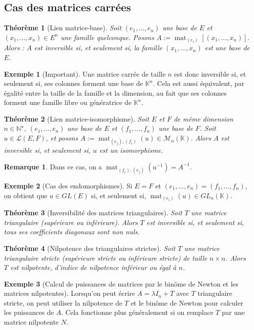 \documentclass[french]{book}
\newcommand{\N}{\mathbb{N}}
\newcommand{\K}{\mathbb{K}}
\newcommand{\st}{^\star}
\newcommand{\inv}{^{-1}}
\theoremstyle{plain}
\newtheorem{thm}{Théorème}[chapter]
\theoremstyle{definition}
\newtheorem{exa}{Exemple}[chapter]
\newtheorem{rmq}{Remarque}[chapter]
\theoremstyle{remark}
\DeclareMathOperator{\mat}{mat}
\begin{document}
\subsection{Cas des matrices carrées}
\begin{thm}[Lien matrice-base]
	Soit $(e_1,\ldots,e_n)$ une base de $E$ et $(x_1,\ldots,x_n)\in E^n$ une famille quelconque. Posons $A:=\mat_{(e_i)}\left[(x_1,\ldots,x_n)\right]$. Alors : $A$ est inversible si, et seulement si, la famille $(x_1,\ldots,x_n)$ est une base de $E$.
\end{thm}
\begin{exa}[Important]
	Une matrice carrée de taille $n$ est donc inversible si, et seulement si, ses colonnes forment une base de $\K^n$. Cela est aussi équivalent, par égalité entre la taille de la famille et la dimension, au fait que ses colonnes forment une famille libre ou génératrice de $\K^n$.
\end{exa}
\begin{thm}[Lien matrice-isomorphisme]
	Soit $E$ et $F$ de même dimension $n\in\N\st$, $(e_1,\ldots,e_n)$ une base de $E$ et $(f_1,\ldots,f_n)$ une base de $F$. Soit $u\in\mathcal{L}(E,F)$, et posons $A:=\mat_{(e_j),(f_i)}(u)\in\mathcal{M}_n(\K)$. Alors $A$ est inversible si, et seulement si, $u$ est un isomorphisme.
\end{thm}
\begin{rmq}
	Dans ce cas, on a $\mat_{(f_i),(e_j)}(u\inv)=A\inv$.
\end{rmq}
\begin{exa}[Cas des endomorphismes]
	Si $E=F$ et $(e_1,\ldots,e_n)=(f_1,\ldots,f_n)$, on obtient que $u\in GL(E)$ si, et seulement si, $\mat_{(e_i)}(u)\in GL_n(\K)$.
\end{exa}
\begin{thm}[Inversibilité des matrices triangulaires]
	Soit $T$ une matrice triangulaire (supérieure ou inférieure). Alors $T$ est inversible si, et seulement si, tous ses coefficients diagonaux sont non nuls.
\end{thm}
\begin{thm}[Nilpotence des triangulaires strictes]
	Soit $T$ une matrice triangulaire stricte (supérieure stricte ou inférieure stricte) de taille $n\times n$. Alors $T$ est nilpotente, d'indice de nilpotence inférieur ou égal à $n$.
\end{thm}
\begin{exa}[Calcul de puissances de matrices par le binôme de Newton et les matrices nilpotentes]
	Lorsqu'on peut écrire $A=\lambda I_n+T$ avec $T$ triangulaire stricte, on peut utiliser la nilpotence de $T$ et le binôme de Newton pour calculer les puissances de $A$. Cela fonctionne plus généralement si on remplace $T$ par une matrice nilpotente $N$.
\end{exa}
\end{document}
